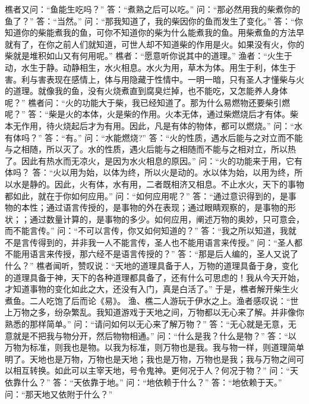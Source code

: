 \documentclass[12pt,UTF8]{ctexbook}
\begin{document}
樵者又问：“鱼能生吃吗？”
答：“煮熟之后可以吃。”
问：“那必然用我的柴煮你的鱼了？”
答：“当然。”
问：“那我知道了，我的柴因你的鱼而发生了变化。”
答：“你知道你的柴能煮我的鱼，可你不知道你的柴为什么能煮我的鱼。用柴煮鱼的方法早就有了，在你之前人们就知道，可世人却不知道柴的作用是火。如果没有火，你的柴就是堆积如山又有何用呢。”
樵者：“愿意听你说其中的道理。”
渔者：“火生于动，水生于静。动静相生，水火相息。水火为用，草木为体。用生于利，体生于害。利与害表现在感情上，体与用隐藏于性情中。一明一暗，只有圣人才懂柴与火的道理。就像我的鱼，没有火烧煮直到腐臭烂掉，也不能吃，又怎能养人身体呢？”
樵者问：“火的功能大于柴，我已经知道了。那为什么易燃物还要柴引燃呢？”
答：“柴是火的本体，火是柴的作用。火本无体，通过柴燃烧后才有体。柴本无作用，待火烧起后才为有用。因此，凡是有体的物体，都可以燃烧。”
问：“水有体吗？”
答：“有。”
问：“水能燃烧?”
答：“火的性质，遇水后能与之对立而不能与之相随，所以灭了。水的性质，遇火后能与之相随而不能与之相对立，所以热了。因此有热水而无凉火，是因为水火相息的原因。”
问：“火的功能来于用，它有体吗？
答：“火以用为始，以体为终，所以火是动的。水以体为始，以用为终，所以水是静的。因此，火有体，水有用，二者既相济又相息。不止水火，天下的事物都如此，就在于你如何应用。”
问：“如何应用呢？”
答：“通过意识得到的，是事物的本性；通过语言传授的，是事物的外在表现；通过眼睛观察的，是事物的形状；；通过数量计算的，是事物的多少。如何应用，阐述万物的奥妙，只可意会，而不能言传。”
问：“不可以言传，你又如何知道的？”
答：“我之所以知道，我就不是言传得到的，并非我一人不能言传，圣人也不能用语言来传授。”
问：“圣人都不能用语言来传授，那六经不是语言传授的？”
答：“那是后人编的，圣人又说了什么？”
樵者闻听，赞叹说：“天地的道理具备于人，万物的道理具备于身，变化的道理具备于神，天下的各种道理都具备了，还有什么可思虑的！我从今天开始，才知道事物的变化如此之大，还没有入门，真是白活了。”
于是，樵者解开柴生火煮鱼。二人吃饱了后而论《易》。
渔、樵二人游玩于伊水之上。渔者感叹说：“世上万物之多，纷杂繁乱。我知道游戏于天地之间，万物都以无心来了解。并非像你熟悉的那样简单。”
问：“请问如何以无心来了解万物？”
答：“无心就是无意，无意就是不把我与物分开，然后物物相通。”
问：“什么是我？什么是物？”
答：“以万物为标准，则我也是物。以我为标准，则万物也是我。我与物一样，则道理简单明了。天地也是万物，万物也是天地；我也是万物，万物也是我；我与万物之间可以相互转换。如此可以主宰天地，号令鬼神。更何况于人？何况于物？”
问：“天依靠什么？”
答：“天依靠于地。”
问：“地依赖于什么？”
答：“地依赖于天。”
问：“那天地又依附于什么？”
\end{document}
